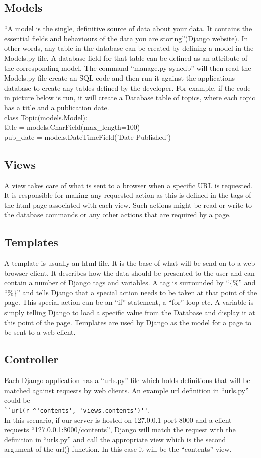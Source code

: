 \documentclass{l3proj}
\begin{document}
\subsection{Models}
``A model is the single, definitive source of data about your data. It contains the essential 
fields and behaviours of the data you are storing''(Django website). In other words, any 
table in the database can be created by defining a model in the Models.py file. A 
database field for that table can be defined as an attribute of the corresponding model. 
The command ``manage.py syncdb'' will then read the Models.py file create an SQL code 
and then run it against the applications database to create any tables defined by the 
developer. 
For example, if the code in picture below is run, it will create a Database table of topics, 
where each topic has a title and a publication date. \\
class Topic(models.Model): \\
title = models.CharField(max\_length=100) \\
pub\_date = models.DateTimeField('Date Published')\\
\subsection{Views}
A view takes care of what is sent to a browser when a specific URL is requested. It is 
responsible for making any requested action as this is defined in the tags of the html 
page associated with each view. Such actions might be read or write to the database 
commands or any other actions that are required by a page.
\subsection{Templates}
A template is usually an html file. It is the base of what will be send on to a web browser 
client. It describes how the data should be presented to the user and can contain a 
number of Django tags and variables. A tag is surrounded by ``\{\%'' and ``\%\}'' and tells 
Django that a special action needs to be taken at that point of the page. This special 
action can be an ``if'' statement, a ``for'' loop etc. A variable is simply telling Django to load 
a specific value from the Database and display it at this point of the page. Templates are 
used by Django as the model for a page to be sent to a web client.
\subsection{Controller}
Each Django application has a ``urls.py'' file which holds definitions that will be matched 
against requests by web clients. An example url definition in ``urls.py'' could be \\
\verb|``url(r ^'contents', 'views.contents')''|. \\In this scenario, if our server is hosted on 127.0.0.1 
port 8000 and a client requests ``127.0.0.1:8000/contents'', Django will match the 
request with the definition in ``urls.py'' and call the appropriate view which is the second 
argument of the url() function. In this case it will be the ``contents'' view.
\end{document}
